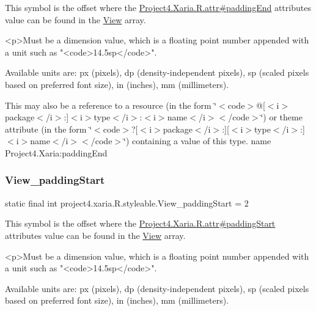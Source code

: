 This symbol is the offset where the \hyperlink{}{Project4.\+Xaria.\+R.\+attr\#padding\+End} attribute\textquotesingle{}s value can be found in the \hyperlink{classproject4_1_1xaria_1_1R_1_1styleable_a26a934fb1a597b7811923bdd4d3d8ecf}{View} array.

\begin{DoxyVerb}      <p>Must be a dimension value, which is a floating point number appended with a unit such as "<code>14.5sp</code>".
\end{DoxyVerb}
 Available units are\+: px (pixels), dp (density-\/independent pixels), sp (scaled pixels based on preferred font size), in (inches), mm (millimeters). 

This may also be a reference to a resource (in the form \char`\"{}$<$code$>$@\mbox{[}$<$i$>$package$<$/i$>$\+:\mbox{]}$<$i$>$type$<$/i$>$\+:$<$i$>$name$<$/i$>$$<$/code$>$\char`\"{}) or theme attribute (in the form \char`\"{}$<$code$>$?\mbox{[}$<$i$>$package$<$/i$>$\+:\mbox{]}\mbox{[}$<$i$>$type$<$/i$>$\+:\mbox{]}$<$i$>$name$<$/i$>$$<$/code$>$\char`\"{}) containing a value of this type.  name Project4.\+Xaria\+:padding\+End \mbox{\label{classproject4_1_1xaria_1_1R_1_1styleable_a82fdb93ccc6551d224d5777d9f449770}} 
\subsubsection{\texorpdfstring{View\+\_\+padding\+Start}{View\_paddingStart}}
{\footnotesize\ttfamily static final int project4.\+xaria.\+R.\+styleable.\+View\+\_\+padding\+Start = 2\hspace{0.3cm}{\ttfamily [static]}}

This symbol is the offset where the \hyperlink{}{Project4.\+Xaria.\+R.\+attr\#padding\+Start} attribute\textquotesingle{}s value can be found in the \hyperlink{classproject4_1_1xaria_1_1R_1_1styleable_a26a934fb1a597b7811923bdd4d3d8ecf}{View} array.

\begin{DoxyVerb}      <p>Must be a dimension value, which is a floating point number appended with a unit such as "<code>14.5sp</code>".
\end{DoxyVerb}
 Available units are\+: px (pixels), dp (density-\/independent pixels), sp (scaled pixels based on preferred font size), in (inches), mm (millimeters). 

